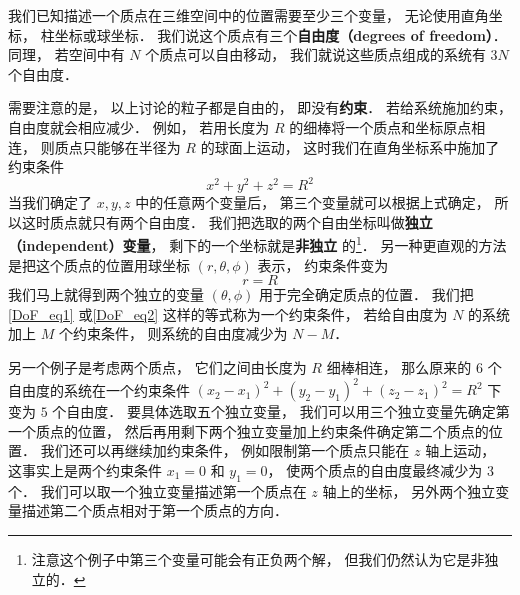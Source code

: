 

我们已知描述一个质点在三维空间中的位置需要至少三个变量， 无论使用直角坐标， 柱坐标或球坐标． 我们说这个质点有三个\textbf{自由度（degrees of freedom）}． 同理， 若空间中有 $N$ 个质点可以自由移动， 我们就说这些质点组成的系统有 $3N$ 个自由度．

需要注意的是， 以上讨论的粒子都是自由的， 即没有\textbf{约束}． 若给系统施加约束， 自由度就会相应减少． 例如， 若用长度为 $R$ 的细棒将一个质点和坐标原点相连， 则质点只能够在半径为 $R$ 的球面上运动， 这时我们在直角坐标系中施加了约束条件
\begin{equation}\label{DoF_eq1}
x^2 + y^2 + z^2 = R^2
\end{equation}
当我们确定了 $x, y, z$ 中的任意两个变量后， 第三个变量就可以根据上式确定， 所以这时质点就只有两个自由度． 我们把选取的两个自由坐标叫做\textbf{独立（independent）变量}， 剩下的一个坐标就是\textbf{非独立} 的\footnote{注意这个例子中第三个变量可能会有正负两个解， 但我们仍然认为它是非独立的．}． 另一种更直观的方法是把这个质点的位置用球坐标 $(r, \theta, \phi)$ 表示， 约束条件变为
\begin{equation}\label{DoF_eq2}
r = R
\end{equation}
我们马上就得到两个独立的变量 $(\theta, \phi)$ 用于完全确定质点的位置． 我们把\autoref{DoF_eq1} 或\autoref{DoF_eq2} 这样的等式称为一个约束条件， 若给自由度为 $N$ 的系统加上 $M$ 个约束条件， 则系统的自由度减少为 $N - M$．

另一个例子是考虑两个质点， 它们之间由长度为 $R$ 细棒相连， 那么原来的 $6$ 个自由度的系统在一个约束条件 $(x_2 - x_1)^2 + (y_2 - y_1)^2 + (z_2 - z_1)^2 = R^2$ 下变为 $5$ 个自由度． 要具体选取五个独立变量， 我们可以用三个独立变量先确定第一个质点的位置， 然后再用剩下两个独立变量加上约束条件确定第二个质点的位置． 我们还可以再继续加约束条件， 例如限制第一个质点只能在 $z$ 轴上运动， 这事实上是两个约束条件 $x_1 = 0$ 和 $y_1 = 0$， 使两个质点的自由度最终减少为 3 个． 我们可以取一个独立变量描述第一个质点在 $z$ 轴上的坐标， 另外两个独立变量描述第二个质点相对于第一个质点的方向．

